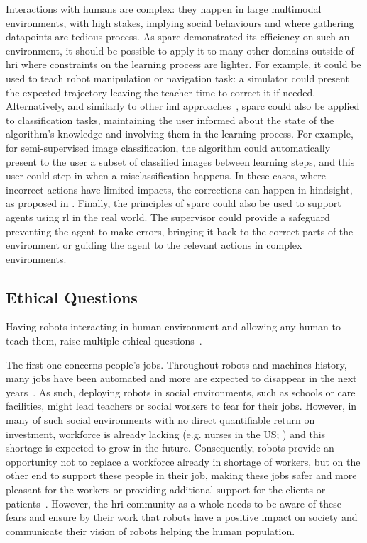 Interactions with humans are complex: they happen in large multimodal environments, with high stakes, implying social behaviours and where gathering datapoints are tedious process. As \gls{sparc} demonstrated its efficiency on such an environment, it should be possible to apply it to many other domains outside of \gls{hri} where constraints on the learning process are lighter. For example, it could be used to teach robot manipulation or navigation task: a simulator could present the expected trajectory leaving the teacher time to correct it if needed. Alternatively, and similarly to other \gls{iml} approaches~\citep{fails2003interactive}, \gls{sparc} could also be applied to classification tasks, maintaining the user informed about the state of the algorithm's knowledge and involving them in the learning process. For example, for semi-supervised image classification, the algorithm could automatically present to the user a subset of classified images between learning steps, and this user could step in when a misclassification happens. In these cases, where incorrect actions have limited impacts, the corrections can happen in hindsight, as proposed in \cite{chernova2009interactive}. Finally, the principles of \gls{sparc} could also be used to support agents using \gls{rl} in the real world. The supervisor could provide a safeguard preventing the agent to make errors, bringing it back to the correct parts of the environment or guiding the agent to the relevant actions in complex environments.

\subsection{Ethical Questions} \label{sec:disc_ethics}
Having robots interacting in human environment and allowing any human to teach them, raise multiple ethical questions~\citep{lin2014robot}.

The first one concerns people's jobs. Throughout robots and machines history, many jobs have been automated and more are expected to disappear in the next years~\citep{frey2017future}. As such, deploying robots in social environments, such as schools or care facilities, might lead teachers or social workers to fear for their jobs. However, in many of such social environments with no direct quantifiable return on investment, workforce is already lacking (e.g. nurses in the US; \citealt{nevidjon2001nursing}) and this shortage is expected to grow in the future. Consequently, robots provide an opportunity not to replace a workforce already in shortage of workers, but on the other end to support these people in their job, making these jobs safer and more pleasant for the workers or providing additional support for the clients or patients~\citep{wada2005psychological}. However, the \gls{hri} community as a whole needs to be aware of these fears and ensure by their work that robots have a positive impact on society and communicate their vision of robots helping the human population.

